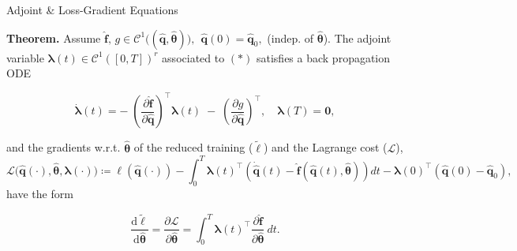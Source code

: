 \begin{frame}{Adjoint \& Loss-Gradient Equations}
    
\textbf{Theorem.} Assume $\hat{\mathbf{f}},\,g \in \mathcal{C}^1\bigl((\hat{\mathbf{q}},\hat{\bm{\theta}})\bigr), ~~
\hat{\mathbf{q}}(0)=\hat{\mathbf{q}}_0,$ (indep. of $\hat{\bm{\theta}}$). The \textcolor{codeblue}{adjoint variable} $\bm{\lambda}(t)\in\mathcal{C}^1([0,T])^r$ associated to $\bm{(*)}$ satisfies a back propagation ODE
\begin{center}
\begin{tcolorbox}[width=11cm, colback=gray!10, colframe=gray!50, boxrule=0.5pt, arc=2pt]
\begin{equation*}
        \dot{\bm{\lambda}}(t) = -\;\left(\dfrac{\partial \hat{\mathbf{f}}}{\partial \hat{\mathbf{q}}}\right)^{\top}\bm{\lambda}(t)\;-\; \left(\dfrac{\partial g}{\partial \hat{\mathbf{q}}}\right)^{\top} ,\quad\bm{\lambda}(T)=\bm{0},
        \label{eq:adjoint_eqs}
\end{equation*}
\end{tcolorbox}\end{center}
and the \textcolor{codeblue}{gradients} w.r.t. $\hat{\bm{\theta}}$ of the reduced training ($\tilde\ell$) and the Lagrange cost ($\mathscr{L}$),
\begin{equation*}
        \mathscr{L}\bigl(\hat{\mathbf{q}}(\cdot),\hat{\bm{\theta}},\bm{\lambda}(\cdot)\bigr) \coloneqq \ell(\hat{\mathbf{q}}(\cdot)) - \int_0^T \bm{\lambda}(t)^{\top}\left( \dot{\hat{\mathbf{q}}}(t)-\hat{\mathbf{f}}(\hat{\mathbf{q}}(t),\hat{\bm{\theta}}) \right)dt - \bm{\lambda}(0)^{\top}(\hat{\mathbf{q}}(0)-\hat{\mathbf{q}}_0),
        \label{eq:lagrange_cost2}
\end{equation*}
have the form
\vspace{-0.6cm}
\begin{center}
\begin{tcolorbox}[width=7.7cm, colback=gray!10, colframe=gray!50, boxrule=0.5pt, arc=2pt]
\begin{equation*}
        \dfrac{\mathrm{d} \tilde{\ell}}{\mathrm{d} \hat{\bm{\theta}}} = \dfrac{\partial \mathscr{L}}{\partial\hat{\bm{\theta}}} = \int_0^T \bm{\lambda}(t)^{\top} \dfrac{\partial\hat{\textbf{f}}}{\partial\hat{\bm{\theta}}}~dt.
        \label{eq:gradient_lagrange}
\end{equation*}
\end{tcolorbox}\end{center}
    
\end{frame}

